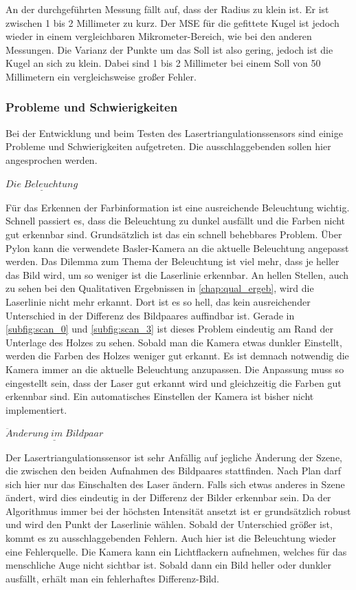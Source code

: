 		An der durchgeführten Messung fällt auf, dass der Radius zu klein ist. Er ist zwischen 1 bis 2 Millimeter zu kurz. Der MSE für die gefittete Kugel ist jedoch wieder in einem vergleichbaren Mikrometer-Bereich, wie bei den anderen Messungen. Die Varianz der Punkte um das \glqq Soll\grqq{} ist also gering, jedoch ist die Kugel an sich zu klein. Dabei sind 1 bis 2 Millimeter bei einem Soll von 50 Millimetern ein vergleichsweise großer Fehler. 
		
		\subsubsection{Probleme und Schwierigkeiten}\label{chap:probleme_schwierigkeiten}
		Bei der Entwicklung und beim Testen des Lasertriangulationssensors sind einige Probleme und Schwierigkeiten aufgetreten. Die ausschlaggebenden sollen hier angesprochen werden.
		
		$\underline{Die \; Beleuchtung}$
		
		Für das Erkennen der Farbinformation ist eine ausreichende Beleuchtung wichtig. Schnell passiert es, dass die Beleuchtung zu dunkel ausfällt und die Farben nicht gut erkennbar sind. Grundsätzlich ist das ein schnell behebbares Problem. Über Pylon kann die verwendete Basler-Kamera an die aktuelle Beleuchtung angepasst werden. Das Dilemma zum Thema der Beleuchtung ist viel mehr, dass je heller das Bild wird, um so weniger ist die Laserlinie erkennbar. An hellen Stellen, auch zu sehen bei den Qualitativen Ergebnissen in \ref{chap:qual_ergeb}, wird die Laserlinie nicht mehr erkannt. Dort ist es so hell, das kein ausreichender Unterschied in der Differenz des Bildpaares auffindbar ist. Gerade in \ref{subfig:scan_0} und \ref{subfig:scan_3} ist dieses Problem eindeutig am Rand der Unterlage des Holzes zu sehen. Sobald man die Kamera etwas dunkler Einstellt, werden die Farben des Holzes weniger gut erkannt. Es ist demnach notwendig die Kamera immer an die aktuelle Beleuchtung anzupassen. Die Anpassung muss so eingestellt sein, dass der Laser gut erkannt wird und gleichzeitig die Farben gut erkennbar sind. Ein automatisches Einstellen der Kamera ist bisher nicht implementiert.
		
		$\underline{\ddot{A}nderung \; im \; Bildpaar}$
		
		Der Lasertriangulationssensor ist sehr Anfällig auf jegliche Änderung der Szene, die zwischen den beiden Aufnahmen des Bildpaares stattfinden. Nach Plan darf sich hier nur das Einschalten des Laser ändern. Falls sich etwas anderes in Szene ändert, wird dies eindeutig in der Differenz der Bilder erkennbar sein. Da der Algorithmus immer bei der höchsten Intensität ansetzt ist er grundsätzlich robust und wird den Punkt der Laserlinie wählen. Sobald der Unterschied größer ist, kommt es zu ausschlaggebenden Fehlern. Auch hier ist die Beleuchtung wieder eine Fehlerquelle. Die Kamera kann ein Lichtflackern aufnehmen, welches für das menschliche Auge nicht sichtbar ist. Sobald dann ein Bild heller oder dunkler ausfällt, erhält man ein fehlerhaftes Differenz-Bild.
		

